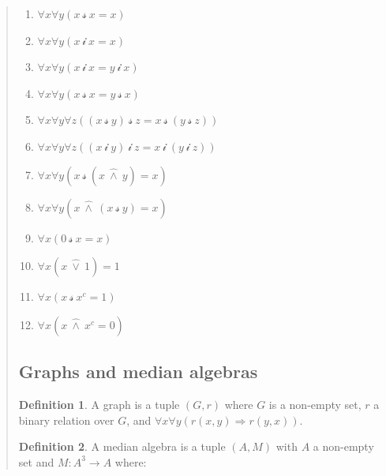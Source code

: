 \documentclass[a4paper, 12pt]{article}
\theoremstyle{definition}
\theoremstyle{definition}
\theoremstyle{definition}
\newtheorem{definition}{Definition}
\begin{document}
\begin{quote}
\begin{enumerate}
    \item $\forall x \forall  y \left( x ~\mathcal{s}~ x = x \right) $
    \item $\forall x \forall  y \left( x ~\mathcal{i}~ x = x \right) $
    \item $\forall x \forall  y \left( x ~\mathcal{i}~ x = y ~\mathcal{i}~ x \right) $
    \item $\forall x \forall  y \left( x ~\mathcal{s}~ x = y ~\mathcal{s}~ x \right) $
    \item $\forall x \forall  y \forall z\left( (x ~\mathcal{s}~y) ~\mathcal{s}~z = x ~\mathcal{s}~(y ~\mathcal{s}~z) \right) $
    \item $\forall x \forall  y \forall z\left( (x ~\mathcal{i}~y) ~\mathcal{i}~z = x ~\mathcal{i}~(y ~\mathcal{i}~z) \right) $
    \item $\forall x \forall  y \left( x ~\mathcal{s}~(x ~\hat{\land }~y) = x \right) $
    \item $\forall x \forall  y \left( x ~\hat{\land }~(x ~\mathcal{s}~y) = x \right) $
    \item $\forall x \left( 0 ~\mathcal{s}~ x  = x\right) $
    \item $\forall x \left( x ~\hat{\lor }~ 1 \right) = 1 $
    \item $\forall x \left( x ~\mathcal{s}~ x^c = 1 \right) $
    \item $\forall x \left( x ~\hat{\land }~ x^c = 0 \right) $
\end{enumerate}



\subsection{Graphs and median algebras}

\begin{definition}
    A graph is a tuple $(G, r)$ where $G$ is a non-empty set, $r$ a binary
    relation over $G$, and $\forall x \forall y \left( r(x, y) \Rightarrow r(y,
    x) \right) $.
\end{definition}

\begin{definition}
    A median algebra is a tuple $(A, M)$ with $A$ a non-empty set and $M: A^3 \to A$ where: 


\end{definition}
\end{quote}
\end{document}
